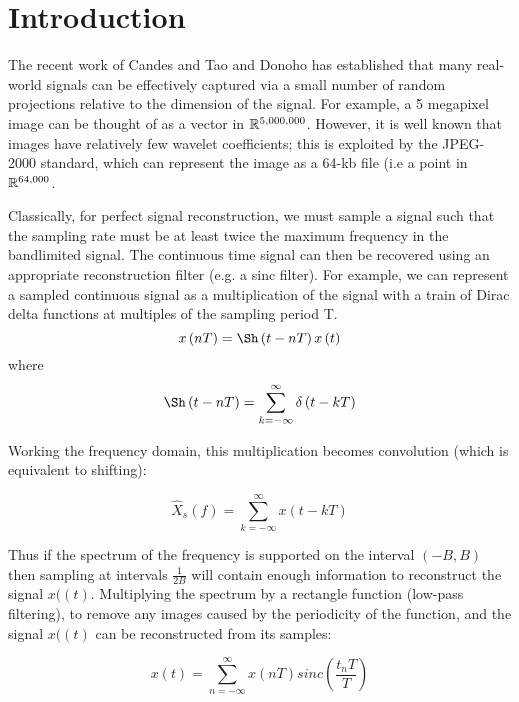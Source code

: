 \section{Introduction}

The recent work of Candes and Tao \cite{Candes2006} and Donoho \cite{Donoho2006} has established that many real-world signals can be effectively captured via a small number of random projections relative to the dimension of the signal. For example, a 5 megapixel image can be thought of as a vector in \({\mathbb{R}}^{5,000,000}\). However, it is well known that images have relatively few wavelet coefficients; this is exploited by the JPEG-2000 standard, which can represent the image as a 64-kb file (i.e a point in \({\mathbb{R}}^{64,000}\).

Classically, for perfect signal reconstruction, we must sample a signal such that the sampling rate must be at least twice the maximum frequency in the bandlimited signal. The continuous time signal can then be recovered using an appropriate reconstruction filter (e.g. a sinc filter). For example, we can represent a sampled continuous signal as a multiplication of the signal with a train of Dirac delta functions at multiples of the sampling period T.
%
\begin{equation}
x\left(nT\right) = \Sh\left(t-nT\right)x\left(t\right)
\end{equation}
%
where
%
\begin{equation}
\Sh\left(t-nT\right) = \sum_{k=-\infty}^{\infty} \delta\left(t - kT\right)
\end{equation}

Working the frequency domain, this multiplication becomes convolution (which is equivalent to shifting):

\begin{equation}
\hat{X}_{s}\left(f\right) = \sum_{k=-\infty}^\infty x\left(t - kT\right)
\end{equation}

Thus if the spectrum of the frequency is supported on the interval \(\left(-B, B\right)\) then sampling at intervals \(\frac{1}{2B}\) will contain enough information to reconstruct the signal \(x(\left(t\right)\). Multiplying the spectrum by a rectangle function (low-pass filtering), to remove any images caused by the periodicity of the function, and the signal \(x(\left(t\right)\) can be reconstructed from its samples:

\begin{equation}
x\left(t\right) = \sum_{n=-\infty}^\infty x\left(nT\right) sinc\left(\frac{t_nT}{T}\right)
\end{equation}

